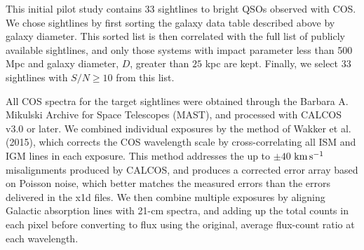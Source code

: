\documentclass[iop]{emulateapj-rtx4}
\begin{document}
This initial pilot study contains 33 sightlines to bright QSOs observed with COS. We chose sightlines by first sorting the galaxy data table described above by galaxy diameter. This sorted list is then correlated with the full list of publicly available sightlines, and only those systems with impact parameter less than 500 Mpc and galaxy diameter, $D$, greater than $25$ kpc  are kept. Finally, we select 33 sightlines with $S/N \geq 10$ from this list.


All COS spectra for the target sightlines were obtained through the Barbara A. Mikulski Archive for Space Telescopes (MAST), and processed with CALCOS v3.0 or later. We combined individual exposures by the method of Wakker et al. (2015), which corrects the COS wavelength scale by cross-correlating all ISM and IGM lines in each exposure. This method addresses the up to $\pm40$ $\rm km\, s^{-1}$ misalignments produced by CALCOS, and produces a corrected error array based on Poisson noise, which better matches the measured errors than the errors delivered in the x1d files. We then combine multiple exposures by aligning Galactic absorption lines with 21-cm spectra, and adding up the total counts in each pixel before converting to flux using the original, average flux-count ratio at each wavelength.


\end{document}

